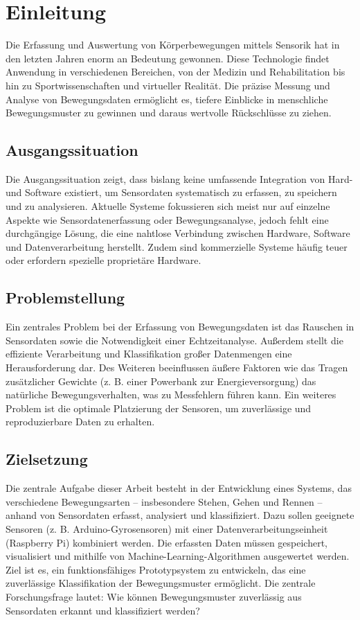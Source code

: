 \chapter{Einleitung}
Die Erfassung und Auswertung von Körperbewegungen mittels Sensorik hat in den letzten Jahren enorm an Bedeutung gewonnen. Diese Technologie findet Anwendung in verschiedenen Bereichen, von der Medizin und Rehabilitation bis hin zu Sportwissenschaften und virtueller Realität. Die präzise Messung und Analyse von Bewegungsdaten ermöglicht es, tiefere Einblicke in menschliche Bewegungsmuster zu gewinnen und daraus wertvolle Rückschlüsse zu ziehen.

\section{Ausgangssituation}
Die Ausgangssituation zeigt, dass bislang keine umfassende Integration von Hard-
und Software existiert, um Sensordaten systematisch zu erfassen, zu speichern und zu
analysieren. Aktuelle Systeme fokussieren sich meist nur auf einzelne Aspekte wie Sensordatenerfassung oder Bewegungsanalyse, jedoch fehlt eine durchgängige Lösung, die eine nahtlose Verbindung zwischen Hardware, Software und Datenverarbeitung herstellt. Zudem sind kommerzielle Systeme häufig teuer oder erfordern spezielle proprietäre Hardware.

\section{Problemstellung}
Ein zentrales Problem bei der Erfassung von Bewegungsdaten ist das Rauschen in Sensordaten sowie die Notwendigkeit einer Echtzeitanalyse. Außerdem stellt die effiziente Verarbeitung und Klassifikation großer Datenmengen eine Herausforderung dar. Des Weiteren beeinflussen äußere Faktoren wie das Tragen zusätzlicher Gewichte (z. B. einer Powerbank zur Energieversorgung) das natürliche Bewegungsverhalten, was zu Messfehlern führen kann. Ein weiteres Problem ist die optimale Platzierung der Sensoren, um zuverlässige und reproduzierbare Daten zu erhalten.

\section{Zielsetzung}
Die zentrale Aufgabe dieser Arbeit besteht in der Entwicklung eines Systems, das verschiedene Bewegungsarten – insbesondere Stehen, Gehen und Rennen – anhand von Sensordaten erfasst, analysiert und klassifiziert. Dazu sollen geeignete Sensoren (z. B. Arduino-Gyrosensoren) mit einer Datenverarbeitungseinheit (Raspberry Pi) kombiniert werden. Die erfassten Daten müssen gespeichert, visualisiert und mithilfe von Machine-Learning-Algorithmen ausgewertet werden. Ziel ist es, ein funktionsfähiges Prototypsystem zu entwickeln, das eine zuverlässige Klassifikation der Bewegungsmuster ermöglicht. Die zentrale Forschungsfrage lautet: Wie können Bewegungsmuster zuverlässig aus Sensordaten erkannt und klassifiziert werden?

